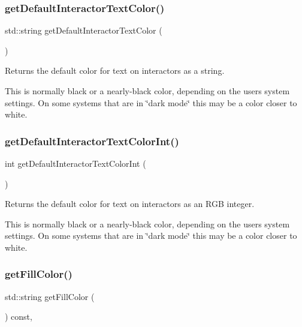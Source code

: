 \subsubsection{\texorpdfstring{get\+Default\+Interactor\+Text\+Color()}{getDefaultInteractorTextColor()}}
{\footnotesize\ttfamily std\+::string get\+Default\+Interactor\+Text\+Color (\begin{DoxyParamCaption}{ }\end{DoxyParamCaption})\hspace{0.3cm}{\ttfamily [static]}}



Returns the default color for text on interactors as a string. 

This is normally black or a nearly-\/black color, depending on the user\textquotesingle{}s system settings. On some systems that are in \char`\"{}dark mode\char`\"{} this may be a color closer to white. \mbox{\label{classGWindow_a66c284abc8a53870127d079f904489c5}} 
\subsubsection{\texorpdfstring{get\+Default\+Interactor\+Text\+Color\+Int()}{getDefaultInteractorTextColorInt()}}
{\footnotesize\ttfamily int get\+Default\+Interactor\+Text\+Color\+Int (\begin{DoxyParamCaption}{ }\end{DoxyParamCaption})\hspace{0.3cm}{\ttfamily [static]}}



Returns the default color for text on interactors as an R\+GB integer. 

This is normally black or a nearly-\/black color, depending on the user\textquotesingle{}s system settings. On some systems that are in \char`\"{}dark mode\char`\"{} this may be a color closer to white. \mbox{\label{classGDrawingSurface_a76f6964a11fde7c78e9751be184e1a3c}} 
\subsubsection{\texorpdfstring{get\+Fill\+Color()}{getFillColor()}}
{\footnotesize\ttfamily std\+::string get\+Fill\+Color (\begin{DoxyParamCaption}{ }\end{DoxyParamCaption}) const\hspace{0.3cm}{\ttfamily [virtual]}, {\ttfamily [inherited]}}



